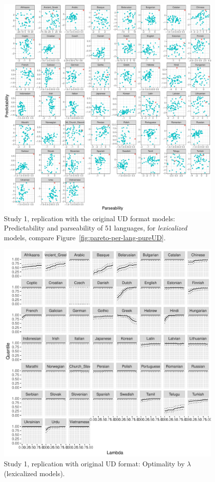 \documentclass[10pt,twoside,lineno]{article}
\begin{document}
\begin{figure}
\centering
\includegraphics[width=\textwidth]{../results/plane/pureUD/pareto-plane-perLanguage-pureUD-mle.pdf}
	\caption[Predictability and Parseability]{Study 1, replication with the original UD format models: Predictability and parseability of 51 languages, for \emph{lexicalized} models, compare Figure~\ref{fig:pareto-per-lang-pureUD}.}
\end{figure}




\begin{figure}
	\centering
	\includegraphics[width=\textwidth]{../results/plane/pureUD/analyze_pareto_optimality/figures/quantileByLambda-mle.pdf}
	\caption{Study 1, replication with original UD format: Optimality by $\lambda$ (lexicalized models).}
\end{figure}
\end{document}
